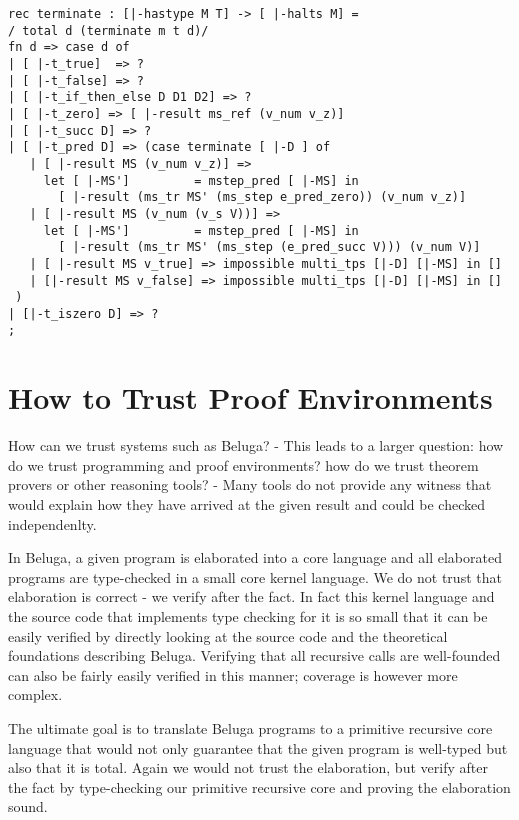 \begin{lstlisting}
rec terminate : [|-hastype M T] -> [ |-halts M] =
/ total d (terminate m t d)/
fn d => case d of
| [ |-t_true]  => ?
| [ |-t_false] => ?
| [ |-t_if_then_else D D1 D2] => ?
| [ |-t_zero] => [ |-result ms_ref (v_num v_z)]
| [ |-t_succ D] => ?
| [ |-t_pred D] => (case terminate [ |-D ] of
   | [ |-result MS (v_num v_z)] =>
     let [ |-MS']         = mstep_pred [ |-MS] in
       [ |-result (ms_tr MS' (ms_step e_pred_zero)) (v_num v_z)]
   | [ |-result MS (v_num (v_s V))] =>
     let [ |-MS']         = mstep_pred [ |-MS] in
       [ |-result (ms_tr MS' (ms_step (e_pred_succ V))) (v_num V)]
   | [ |-result MS v_true] => impossible multi_tps [|-D] [|-MS] in []
   | [|-result MS v_false] => impossible multi_tps [|-D] [|-MS] in []
 )
| [|-t_iszero D] => ?
;
\end{lstlisting}



\section{How to Trust Proof Environments}
How can we trust systems such as Beluga? - This leads to a larger question: how do we trust programming and proof environments? how do we trust theorem provers or other reasoning tools? - Many tools do not provide any witness that would explain how they have arrived at the given result and could be checked independenlty.

In Beluga, a given program is elaborated into a core language and all elaborated programs are type-checked in a small core kernel language. We do not trust that elaboration is correct - we verify after the fact. In fact this kernel language and the source code that implements type checking for it is so small that it can be easily verified by directly looking at the source code and the theoretical foundations describing Beluga. Verifying that all recursive calls are well-founded can also be fairly easily verified in this manner; coverage is however more complex.

The ultimate goal is to translate Beluga programs to a primitive recursive core language that would not only guarantee that the given program is well-typed but also that it is total. Again we would not trust the elaboration, but verify after the fact by type-checking our primitive recursive core and proving the elaboration sound.

